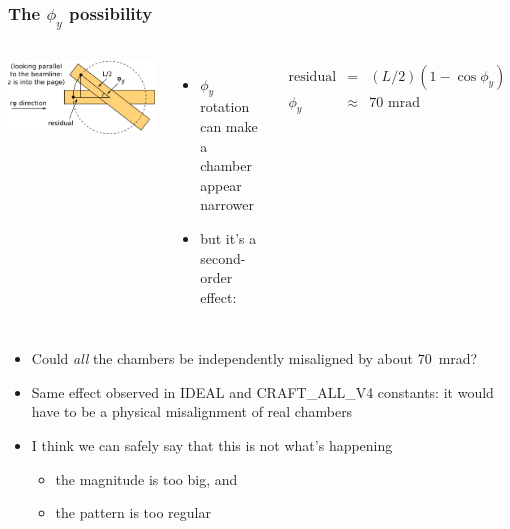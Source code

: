 \documentclass[compress]{beamer}
\begin{document}
\begin{frame}
\frametitle{The $\phi_y$ possibility}

\begin{columns}
\includegraphics[width=\linewidth]{phiy_explanation.png}

\begin{itemize}
\item $\phi_y$ rotation can make a chamber appear narrower
\item but it's a second-order effect:
\end{itemize}

\vspace{-0.75 cm}
\begin{eqnarray*}
\mbox{residual} &=& (L/2) \left(1 - \cos\phi_y\right) \\
\phi_y &\approx& \mbox{70~mrad}
\end{eqnarray*}
\end{columns}

\vfill
\begin{itemize}
\item Could {\it all} the chambers be independently misaligned by about 70~mrad?
\item Same effect observed in IDEAL and CRAFT\_ALL\_V4 constants: it
  would have to be a physical misalignment of real chambers
\item I think we can safely say that this is not what's happening
\begin{itemize}
\item the magnitude is too big, and
\item the pattern is too regular
\end{itemize}
\end{itemize}
\end{frame}
\end{document}
